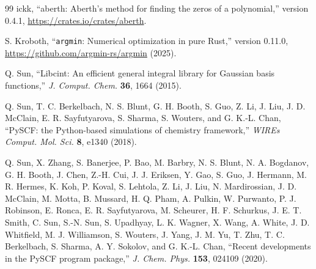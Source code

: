 \documentclass[
 reprint,
 amsmath,amssymb,
 aps,
 physrev,
]{revtex4-2}
\begin{document}
\begin{thebibliography}{99}
    ickk,
    ``aberth: Aberth's method for finding the zeros of a polynomial,''
    version 0.4.1,
    \url{https://crates.io/crates/aberth}.

    S. Kroboth, ``\texttt{argmin}: Numerical optimization in pure Rust,'' version 0.11.0, \url{https://github.com/argmin-rs/argmin} (2025).

    Q. Sun, ``Libcint: An efficient general integral library for Gaussian basis functions,'' \textit{J. Comput. Chem.} \textbf{36}, 1664 (2015).

    Q. Sun, T. C. Berkelbach, N. S. Blunt, G. H. Booth, S. Guo, Z. Li, J. Liu, J. D. McClain, E. R. Sayfutyarova, S. Sharma, S. Wouters, and G. K.-L. Chan, ``PySCF: the Python-based simulations of chemistry framework,'' \textit{WIREs Comput. Mol. Sci.} \textbf{8}, e1340 (2018).

    Q. Sun, X. Zhang, S. Banerjee, P. Bao, M. Barbry, N. S. Blunt, N. A. Bogdanov, G. H. Booth, J. Chen, Z.-H. Cui, J. J. Eriksen, Y. Gao, S. Guo, J. Hermann, M. R. Hermes, K. Koh, P. Koval, S. Lehtola, Z. Li, J. Liu, N. Mardirossian, J. D. McClain, M. Motta, B. Mussard, H. Q. Pham, A. Pulkin, W. Purwanto, P. J. Robinson, E. Ronca, E. R. Sayfutyarova, M. Scheurer, H. F. Schurkus, J. E. T. Smith, C. Sun, S.-N. Sun, S. Upadhyay, L. K. Wagner, X. Wang, A. White, J. D. Whitfield, M. J. Williamson, S. Wouters, J. Yang, J. M. Yu, T. Zhu, T. C. Berkelbach, S. Sharma, A. Y. Sokolov, and G. K.-L. Chan, ``Recent developments in the PySCF program package,'' \textit{J. Chem. Phys.} \textbf{153}, 024109 (2020).

\end{thebibliography}
\end{document}

